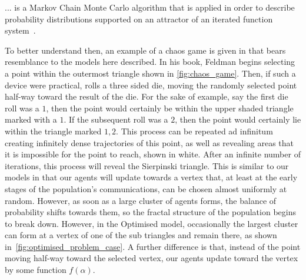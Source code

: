 \begin{displayquote} 
    ... is a Markov Chain Monte Carlo algorithm that is applied in order to describe probability distributions supported on an attractor of an iterated function system~\cite{Barnsley2016ChaosSpaces}.
\end{displayquote}

To better understand then, an example of a chaos game is given in \cite{Feldman.DavidP2012ChaosIntroduction} that bears resemblance to the models here described. In his book, Feldman begins selecting a point within the outermost triangle shown in \cref{fig:chaos_game}. Then, if such a device were practical, rolls a three sided die, moving the randomly selected point half-way toward the result of the die. For the sake of example, say the first die roll was a $1$, then the point would certainly be within the upper shaded triangle marked with a $1$. If the subsequent roll was a $2$, then the point would certainly lie within the triangle marked $1,2$. This process can be repeated ad infinitum creating infinitely dense trajectories of this point, as well as revealing areas that it is impossible for the point to reach, shown in white. After an infinite number of iterations, this process will reveal the Sierpinski triangle. This is similar to our models in that our agents will update towards a vertex that, at least at the early stages of the population's communications, can be chosen almost uniformly at random. However, as soon as a large cluster of agents forms, the balance of probability shifts towards them, so the fractal structure of the population begins to break down. However, in the Optimised model, occasionally the largest cluster can form at a vertex of one of the sub triangles and remain there, as shown in~\cref{fig:optimised_problem_case}. A further difference is that, instead of the point moving half-way toward the selected vertex, our agents update toward the vertex by some function $f(\alpha)$.  

